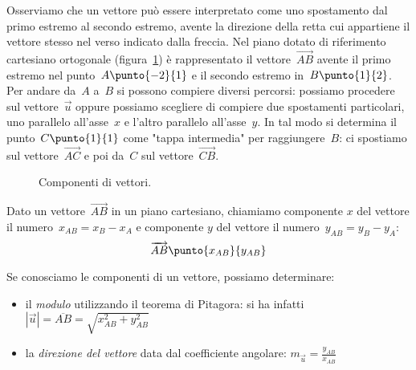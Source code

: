 Osserviamo che un vettore può essere interpretato come uno spostamento dal 
primo estremo al secondo estremo, avente la direzione della retta cui appartiene 
il vettore stesso nel
verso indicato dalla freccia.
Nel piano dotato di riferimento cartesiano ortogonale (figura~\ref{fig:F.4}) 
è rappresentato il vettore~\(\overrightarrow{AB}\) avente 
il primo estremo nel punto~\(A\punto{-2}{1}\) e
il secondo estremo in~\(B\punto{1}{2}\). 
Per andare da~\(A\) a~\(B\) si possono compiere diversi percorsi: 
possiamo procedere sul vettore~\(\vec{u}\) oppure possiamo scegliere di compiere 
due spostamenti particolari,
uno parallelo all'asse~\(x\) e l'altro parallelo all'asse~\(y\). In tal modo si 
determina il punto~\(C\punto{1}{1}\) come "tappa intermedia" per 
raggiungere~\(B\):
ci spostiamo sul vettore~\(\overrightarrow{AC}\) e poi da~\(C\) sul 
vettore~\(\overrightarrow{CB}\).

\begin{inaccessibleblock}
 \begin{figure}[b]
\centering
\scalebox{.8}{}
\caption{Componenti di vettori.}\label{fig:F.4}
\end{figure}
\end{inaccessibleblock}


\begin{definizione}
Dato un vettore~\(\overrightarrow{AB}\) in un piano cartesiano, chiamiamo 
componente \(x\) del vettore il numero~\(x_{AB} = x_B - x_A\) e 
componente \(y\) del vettore il numero~\(y_{AB} = y_B - y_A\):
\[\overrightarrow{AB}\punto{x_{AB}}{y_{AB}}\]
\end{definizione}

Se conosciamo le componenti di un vettore, possiamo determinare:
\begin{itemize} [noitemsep]
 \item 
il \emph{modulo} utilizzando il teorema di Pitagora: 
si ha infatti~\(|\vec{u}|=\overline{AB}=\sqrt{x_{AB}^2+y_{AB}^2}\)
 \item 
la \emph{direzione del vettore} data dal coefficiente angolare:
\(m_{\vec{u}}=\frac{y_{AB}}{x_{AB}}\)
\end{itemize}

